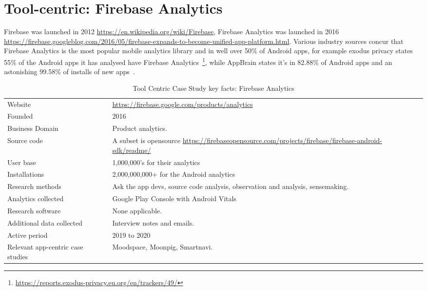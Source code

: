 \clearpage

\section{Tool-centric: Firebase Analytics} 
Firebase was launched in 2012 \url{https://en.wikipedia.org/wiki/Firebase}, Firebase Analytics was launched in 2016 \url{https://firebase.googleblog.com/2016/05/firebase-expands-to-become-unified-app-platform.html}. Various industry sources concur that Firebase Analytics is the most popular mobile analytics library and in well over 50\% of Android apps, for example exodus privacy states 55\% of the Android apps it has analysed have Firebase Analytics~\footnote{\url{https://reports.exodus-privacy.eu.org/en/trackers/49/}}, while AppBrain states it's in 82.88\% of Android apps and an astonishing 99.58\% of installs of new apps~. 

{\renewcommand{\arraystretch}{0.8}%
\begin{table*}
    \centering
    \small
    \setlength{\tabcolsep}{6pt}
    \begin{tabular}{lp{9cm}}
       \toprule
       Website &\url{https://firebase.google.com/products/analytics} \\
       Founded & 2016\footnotemark \\
       Business Domain & Product analytics. \\
       Source code  & A subset is opensource \url{https://firebaseopensource.com/projects/firebase/firebase-android-sdk/readme/} \\
       \midrule
       User base & 1,000,000's for their analytics \\
       Installations & 2,000,000,000+ for the Android analytics\footnotemark \\
       \midrule
       Research methods &Ask the app devs, source code analysis, observation and analysis, sensemaking. \\
       Analytics collected &Google Play Console with Android Vitals \\
       Research software & None applicable. \\
       Additional data collected &Interview notes and emails. \\
       Active period & 2019 to 2020 \\
       Relevant app-centric case studies & Moodspace, Moonpig, Smartnavi.\\
       \bottomrule
    \end{tabular}
    \caption{Tool Centric Case Study key facts: Firebase Analytics}
    \label{tab:firebase_anaytics_overview}
\end{table*}
}

